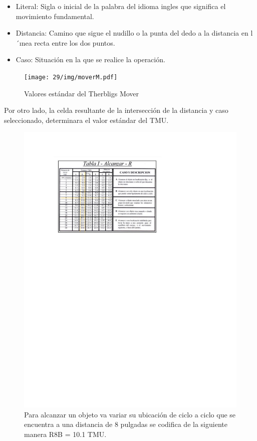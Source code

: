     \begin{itemize}
        \item Literal: Sigla o inicial de la palabra del idioma
    ingles que significa el movimiento fundamental.
    \item Distancia: Camino que sigue el nudillo o la punta
    del dedo a la distancia en l´ınea recta entre los dos
    puntos.
    \item Caso: Situación en la que se realice la operación.
    \end{itemize}
    \begin{figure}[H]
        \centering
        \texttt{[image: 29/img/moverM.pdf]}
        \caption{Valores estándar del Therbligs Mover}
        \label{fig:moverM.pdf}
    \end{figure}
    Por otro lado, la celda resultante de la intersección
    de la distancia y caso seleccionado, determinara el valor
    estándar del TMU.
    \begin{figure}[H]
        \centering
        \includegraphics[trim = {20mm 82mm 20mm 25mm},clip,scale=0.9]{29/img/tablaTmu.pdf}
        \caption{Para alcanzar un objeto va  variar su
    ubicación de ciclo a ciclo que se encuentra a una
    distancia de 8 pulgadas se codifica de la siguiente
    manera R8B = 10.1 TMU.}
        \label{fig:tablaTmu.pdf}
    \end{figure}
